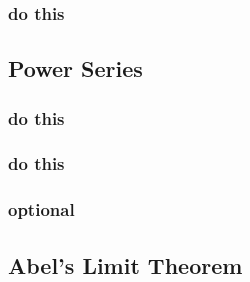 \subsubsection{}
\subsubsection{}
\subsubsection{}
\subsubsection{do this}

\subsection{Power Series}
\subsubsection{}
\subsubsection{}
\subsubsection{do this}
\subsubsection{do this}
\subsubsection{optional}
\subsubsection{}
\subsubsection{}
\subsubsection{}
\subsubsection{}

\subsection{Abel's Limit Theorem}

